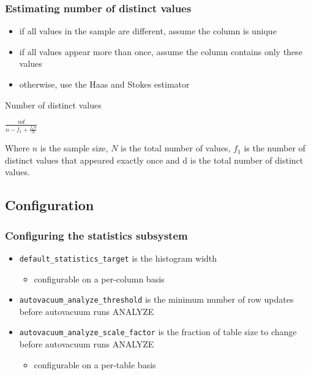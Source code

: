 \documentclass{beamer}
\begin{document}
\begin{frame}
  \frametitle{Estimating number of distinct values}

  \begin{itemize}
  \item if all values in the sample are different, assume the column is \alert{unique}
  \item if all values appear more than once, assume the column contains
    \alert{only these values}
  \item otherwise, use the \alert{Haas and Stokes estimator}
  \end{itemize}

  \begin{block}{Number of distinct values}
    \begin{center}
      $\frac{n d}{n - f_1 + \frac{f_1 n}{N}}$
    \end{center}
    Where $n$ is the sample size, $N$ is the total number of values, $f_1$ is
    the number of distinct values that appeared exactly once and d is the total
    number of distinct values.
  \end{block}
\end{frame}

\subsection{Configuration}

\begin{frame}
  \frametitle{Configuring the statistics subsystem}

  \begin{itemize}
  \item \texttt{default\_statistics\_target} is the \alert{histogram width}
    \begin{itemize}
    \item configurable on a per-column basis
    \end{itemize}
  \item \texttt{autovacuum\_analyze\_threshold} is the minimum \alert{number of
    row updates} before autovacuum runs ANALYZE
  \item \texttt{autovacuum\_analyze\_scale\_factor} is the \alert{fraction of
    table size} to change before autovacuum runs ANALYZE
    \begin{itemize}
    \item configurable on a per-table basis
    \end{itemize}
  \end{itemize}
\end{frame}
\end{document}
